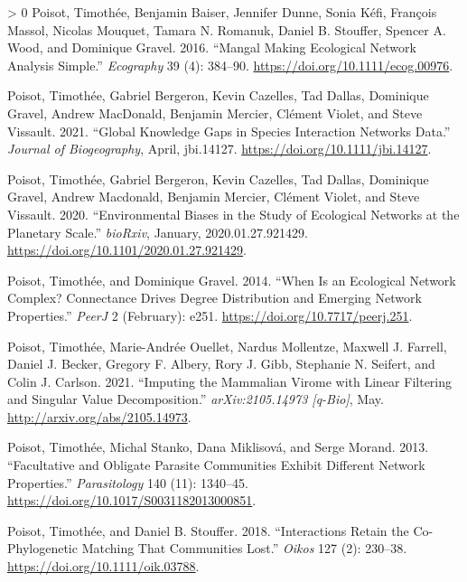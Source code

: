\documentclass[10pt,oneside]{article}
\newlength{\cslhangindent}
\newenvironment{CSLReferences}[3] %
 {%
  \setlength{\parindent}{0pt}
  \ifodd #1 \everypar{\setlength{\hangindent}{\cslhangindent}}\ignorespaces\fi
  \ifnum #2 > 0
  \setlength{\parskip}{#2\baselineskip}
  \fi
 }%
 {}
\begin{document}
\begin{CSLReferences}{1}{0}
\leavevmode\hypertarget{ref-Poisot2016ManMak}{}%
Poisot, Timothée, Benjamin Baiser, Jennifer Dunne, Sonia Kéfi, François
Massol, Nicolas Mouquet, Tamara N. Romanuk, Daniel B. Stouffer, Spencer
A. Wood, and Dominique Gravel. 2016. {``Mangal Making Ecological Network
Analysis Simple.''} \emph{Ecography} 39 (4): 384--90.
\url{https://doi.org/10.1111/ecog.00976}.

\leavevmode\hypertarget{ref-Poisot2021GloKno}{}%
Poisot, Timothée, Gabriel Bergeron, Kevin Cazelles, Tad Dallas,
Dominique Gravel, Andrew MacDonald, Benjamin Mercier, Clément Violet,
and Steve Vissault. 2021. {``Global Knowledge Gaps in Species
Interaction Networks Data.''} \emph{Journal of Biogeography}, April,
jbi.14127. \url{https://doi.org/10.1111/jbi.14127}.

\leavevmode\hypertarget{ref-Poisot2020EnvBia}{}%
Poisot, Timothée, Gabriel Bergeron, Kevin Cazelles, Tad Dallas,
Dominique Gravel, Andrew Macdonald, Benjamin Mercier, Clément Violet,
and Steve Vissault. 2020. {``Environmental Biases in the Study of
Ecological Networks at the Planetary Scale.''} \emph{bioRxiv}, January,
2020.01.27.921429. \url{https://doi.org/10.1101/2020.01.27.921429}.

\leavevmode\hypertarget{ref-Poisot2014WheEco}{}%
Poisot, Timothée, and Dominique Gravel. 2014. {``When Is an Ecological
Network Complex? Connectance Drives Degree Distribution and Emerging
Network Properties.''} \emph{PeerJ} 2 (February): e251.
\url{https://doi.org/10.7717/peerj.251}.

\leavevmode\hypertarget{ref-Poisot2021ImpMam}{}%
Poisot, Timothée, Marie-Andrée Ouellet, Nardus Mollentze, Maxwell J.
Farrell, Daniel J. Becker, Gregory F. Albery, Rory J. Gibb, Stephanie N.
Seifert, and Colin J. Carlson. 2021. {``Imputing the Mammalian Virome
with Linear Filtering and Singular Value Decomposition.''}
\emph{arXiv:2105.14973 {[}q-Bio{]}}, May.
\url{http://arxiv.org/abs/2105.14973}.

\leavevmode\hypertarget{ref-Poisot2013FacObl}{}%
Poisot, Timothée, Michal Stanko, Dana Miklisová, and Serge Morand. 2013.
{``Facultative and Obligate Parasite Communities Exhibit Different
Network Properties.''} \emph{Parasitology} 140 (11): 1340--45.
\url{https://doi.org/10.1017/S0031182013000851}.

\leavevmode\hypertarget{ref-Poisot2018IntRet}{}%
Poisot, Timothée, and Daniel B. Stouffer. 2018. {``Interactions Retain
the Co-Phylogenetic Matching That Communities Lost.''} \emph{Oikos} 127
(2): 230--38. \url{https://doi.org/10.1111/oik.03788}.


\end{CSLReferences}
\end{document}
